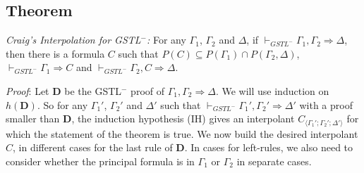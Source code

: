 \subsection{Theorem} \textit{Craig's Interpolation for GSTL$^-$: } For any $\Gamma_1$, $\Gamma_2$ and $\Delta$, if $\vdash_{GSTL^-} \Gamma_1 , \Gamma_2 \Rightarrow \Delta$, then there is a formula $C$ such that $P(C) \subseteq P(\Gamma_1) \cap P(\Gamma_2 , \Delta)$, $\vdash_{GSTL^-} \Gamma_1 \Rightarrow C$ and $\vdash_{GSTL^-} \Gamma_2 , C \Rightarrow \Delta$.

\textit{Proof}: Let $\mathbf{D}$ be the GSTL$^-$ proof of $\Gamma_1 , \Gamma_2 \Rightarrow \Delta$. We will use induction on $h(\mathbf{D})$. So for any $\Gamma_1'$, $\Gamma_2'$ and $\Delta'$ such that $\vdash_{GSTL^-} \Gamma_1' , \Gamma_2' \Rightarrow \Delta'$ with a proof smaller than $\mathbf{D}$, the induction hypothesis (IH) gives an interpolant $C_{\langle\Gamma_1'; \Gamma_2'; \Delta'\rangle}$ for which the statement of the theorem is true. We now build the desired interpolant $C$, in different cases for the last rule of $\mathbf{D}$. In cases for left-rules, we also need to consider whether the principal formula is in $\Gamma_1$ or $\Gamma_2$ in separate cases.
